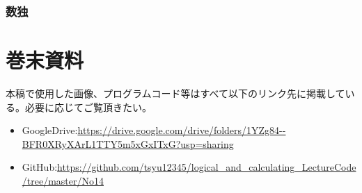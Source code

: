 \documentclass[dvipdfmx]{jsarticle}
\begin{document}
\subsubsection{数独}





\section{巻末資料}
  本稿で使用した画像、プログラムコード等はすべて以下のリンク先に掲載している。必要に応じてご覧頂きたい。
  \begin{itemize}
    \item GoogleDrive:\url{https://drive.google.com/drive/folders/1YZg84--BFR0XRyXArL1TTY5m5xGxITxG?usp=sharing}
    \item GitHub:\url{https://github.com/tsyu12345/logical_and_calculating_LectureCode/tree/master/No14}
  \end{itemize}
\end{document}
